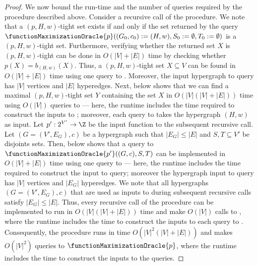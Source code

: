 \begin{proof}
We now bound the run-time and the number of queries required by the procedure described above. Consider a recursive call of the procedure.
We note that a $(p, H, w)$-tight set exists if and only if the set returned by the query $\functionMaximizationOracle{p}((G_0, c_0):= (H, w), S_0:=\emptyset, T_0:=\emptyset)$ is a $(p, H, w)$-tight set.
Furthermore, verifying whether the returned set $X$ is $(p, H, w)$-tight can be done in $O(|V| + |E|)$ time by checking whether $p(X) = b_{(H,w)}(X)$.
Thus, a $(p, H, w)$-tight set $X\subseteq V$ can be found in  $O(|V| + |E|)$ time using one query to . Moreover, the input hypergraph to  query has $|V|$ vertices and $|E|$ hyperedges.
Next,  below shows that we can find a maximal $(p, H, w)$-tight set $Y$ containing the set $X$ in $O(|V|(|V|+|E|))$ time using $O(|V|)$ queries to  --- here, the runtime includes the time required to construct the inputs to ; moreover, each query to  takes the hypergraph $(H, w)$ as input.
Let $p':2^{V'}\rightarrow\Z$ be the input function to the subsequent recursive call. Let $(G = (V', E_G), c)$ be a hypergraph such that $|E_G| \leq |E|$ and $S, T \subseteq V'$ be disjoints sets. 
Then,  below shows that a query to $\functionMaximizationOracle{p'}((G, c), S, T)$ can be implemented in $O(|V| + |E|)$ time using one query to  --- here, the runtime includes the time required to construct the input to  query; moreover the hypergraph input to  query has $|V|$ vertices and $|E_G|$ hyperedges. We note that all hypergraphs $(G = (V', E_G), c)$ that are used as inputs to  during subsequent recursive calls satisfy $|E_G| \leq |E|$.
Thus, every recursive call of the procedure can be implemented to run in $O(|V|(|V|+|E|))$ time and make $O(|V|)$ calls to , where the runtime includes the time to construct the inputs to each query to . Consequently, the procedure runs in time $O(|V|^2(|V|+|E|))$ and makes $O(|V|^2)$ queries to $\functionMaximizationOracle{p}$, where the runtime includes the time to construct the inputs to the  queries.
\end{proof}

